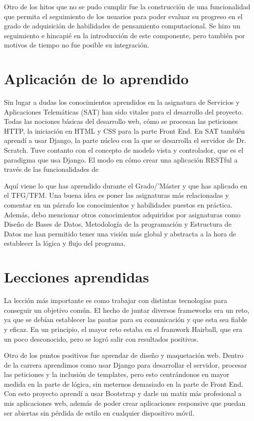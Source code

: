 \documentclass[a4paper, 12pt]{book}
\begin{document}
Otro de los hitos que no se pudo cumplir fue la construcción de una
funcionalidad que permita el seguimiento de los usuarios para poder
evaluar su progreso en el grado de adquisición de habilidades de 
pensamiento computacional. Se hizo un seguimiento e hincapié en la 
introducción de este componente, pero también por motivos de tiempo
no fue posible su integración. 


\section{Aplicación de lo aprendido}
\label{sec:aplicacion}
Sin lugar a dudas los conocimientos aprendidos en la asignatura de Servicios
y Aplicaciones Telemáticas (SAT) han sido vitales para el desarrollo del 
proyecto. Todas las nociones básicas del desarrollo web, cómo se procesan
las peticiones HTTP, la iniciación en HTML y CSS para la parte Front End.
En SAT también aprendí a usar Django, la parte núcleo con la que se 
desarrolla el servidor de Dr. Scratch. Tuve contanto con el concepto de 
modelo vista y controlador, que es el paradigma que usa Django. El modo
en cómo crear una aplicación RESTful a través de las funcionalidades de
 
Aquí viene lo que has aprendido durante el Grado/'Máster y que has aplicado
en el TFG/TFM. Una buena idea es poner las asignaturas más relacionadas y
comentar en un párrafo los conocimientos y habilidades puestos en práctica.
Además, debo mencionar otros conocimientos adquiridos por asignaturas como
Diseño de Bases de Datos, Metodología de la programación y Estructura de 
Datos me han permitido tener una visión más global y abstracta a la hora
de establecer la lógica y flujo del programa.


\section{Lecciones aprendidas}
\label{sec:lecciones_aprendidas}

La lección más importante es como trabajar con distintas tecnologías para
conseguir un objetivo común. El hecho de juntar diversos frameworks era
un reto, ya que se debían establecer las pautas para su comunicación y 
que esta sea fiable y eficaz. En un principio, el mayor reto estaba en el
framwork Hairball, que era un poco desconocido, pero se logró salir con
resultados positivos.

Otro de los puntos positivos fue aprendar de diseño y maquetación web. Dentro
de la carrera aprendimos como usar Django para desarrollar el servidor, 
procesar las peticiones y la inclusión de templates, pero esto centrándonos
en mayor medida en la parte de lógica, sin meternos demasiado en la parte
de Front End. Con esto proyecto aprendí a usar Bootstrap y darle un matiz
más profesional a mis aplicaciones web, además de poder crear aplicaciones
responsive que puedan ser abiertas sin pérdida de estilo en cualquier
dispositivo móvil. 
\end{document}
